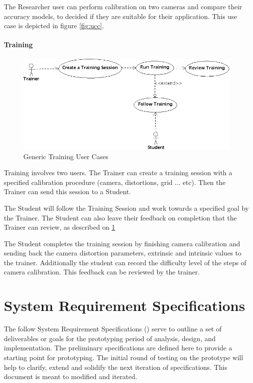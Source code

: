 \documentclass[11pt]{report}
\begin{document}
The Researcher user can perform calibration on two cameras and compare their accuracy models, to decided if they are suitable for their application. This use case is depicted in figure \ref{fig:ucc}.

\subsubsection{Training}

\begin{figure}[htp]
\centering
\includegraphics[scale=0.45]{images/Training.png}
\caption{Generic Training User Cases}
\label{fig:uco}
\end{figure}

Training involves two users. The Trainer can create a training session with a specified calibration procedure (camera, distortions, grid ... etc). Then the Trainer can send this session to a Student. 

The Student will follow the Training Session and work towards a specified goal by the Trainer. The Student can also leave their feedback on completion that the Trainer can review, as described on \ref{fig:uco}

The Student completes the training session by finishing camera calibration and sending back the camera distortion parameters, extrinsic and intrinsic values to the trainer. Additionally the student can record the difficulty level of the steps of camera calibration. This feedback can be reviewed by the trainer.  


\chapter{System Requirement Specifications}



The follow System Requirement Specifications () serve to outline a set of deliverables or goals for the prototyping period of analysis, design, and implementation. The preliminary specifications are defined here to provide a starting point for prototyping. The initial round of testing on the prototype will help to clarify, extend and solidify the next iteration of specifications. This document is meant to modified and iterated.  
\end{document}
